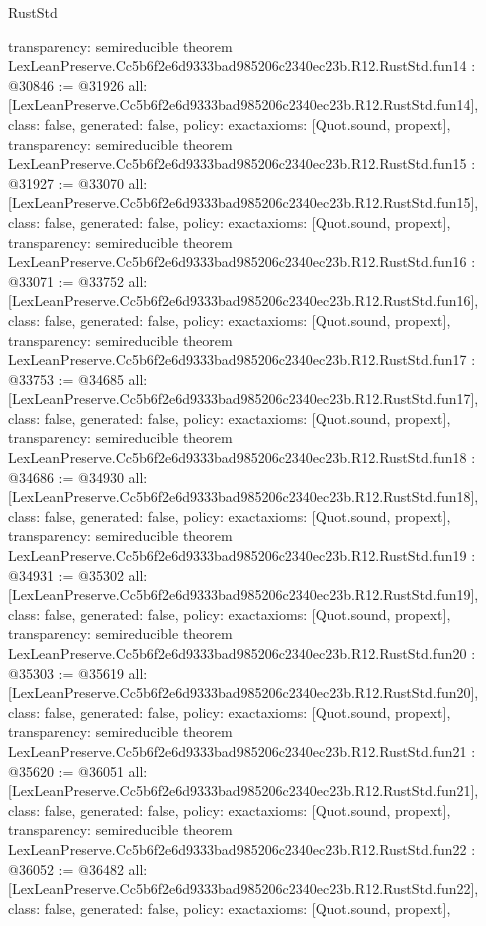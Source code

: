 \begin{lexlean}{RustStd}
\begin{coremodule}
{  transparency: semireducible
}
theorem LexLeanPreserve.Cc5b6f2e6d9333bad985206c2340ec23b.R12.RustStd.fun14 : @30846 := @31926 {
  all: [LexLeanPreserve.Cc5b6f2e6d9333bad985206c2340ec23b.R12.RustStd.fun14],
  class: false,
  generated: false,
  policy: exact{axioms: [Quot.sound, propext]},
  transparency: semireducible
}
theorem LexLeanPreserve.Cc5b6f2e6d9333bad985206c2340ec23b.R12.RustStd.fun15 : @31927 := @33070 {
  all: [LexLeanPreserve.Cc5b6f2e6d9333bad985206c2340ec23b.R12.RustStd.fun15],
  class: false,
  generated: false,
  policy: exact{axioms: [Quot.sound, propext]},
  transparency: semireducible
}
theorem LexLeanPreserve.Cc5b6f2e6d9333bad985206c2340ec23b.R12.RustStd.fun16 : @33071 := @33752 {
  all: [LexLeanPreserve.Cc5b6f2e6d9333bad985206c2340ec23b.R12.RustStd.fun16],
  class: false,
  generated: false,
  policy: exact{axioms: [Quot.sound, propext]},
  transparency: semireducible
}
theorem LexLeanPreserve.Cc5b6f2e6d9333bad985206c2340ec23b.R12.RustStd.fun17 : @33753 := @34685 {
  all: [LexLeanPreserve.Cc5b6f2e6d9333bad985206c2340ec23b.R12.RustStd.fun17],
  class: false,
  generated: false,
  policy: exact{axioms: [Quot.sound, propext]},
  transparency: semireducible
}
theorem LexLeanPreserve.Cc5b6f2e6d9333bad985206c2340ec23b.R12.RustStd.fun18 : @34686 := @34930 {
  all: [LexLeanPreserve.Cc5b6f2e6d9333bad985206c2340ec23b.R12.RustStd.fun18],
  class: false,
  generated: false,
  policy: exact{axioms: [Quot.sound, propext]},
  transparency: semireducible
}
theorem LexLeanPreserve.Cc5b6f2e6d9333bad985206c2340ec23b.R12.RustStd.fun19 : @34931 := @35302 {
  all: [LexLeanPreserve.Cc5b6f2e6d9333bad985206c2340ec23b.R12.RustStd.fun19],
  class: false,
  generated: false,
  policy: exact{axioms: [Quot.sound, propext]},
  transparency: semireducible
}
theorem LexLeanPreserve.Cc5b6f2e6d9333bad985206c2340ec23b.R12.RustStd.fun20 : @35303 := @35619 {
  all: [LexLeanPreserve.Cc5b6f2e6d9333bad985206c2340ec23b.R12.RustStd.fun20],
  class: false,
  generated: false,
  policy: exact{axioms: [Quot.sound, propext]},
  transparency: semireducible
}
theorem LexLeanPreserve.Cc5b6f2e6d9333bad985206c2340ec23b.R12.RustStd.fun21 : @35620 := @36051 {
  all: [LexLeanPreserve.Cc5b6f2e6d9333bad985206c2340ec23b.R12.RustStd.fun21],
  class: false,
  generated: false,
  policy: exact{axioms: [Quot.sound, propext]},
  transparency: semireducible
}
theorem LexLeanPreserve.Cc5b6f2e6d9333bad985206c2340ec23b.R12.RustStd.fun22 : @36052 := @36482 {
  all: [LexLeanPreserve.Cc5b6f2e6d9333bad985206c2340ec23b.R12.RustStd.fun22],
  class: false,
  generated: false,
  policy: exact{axioms: [Quot.sound, propext]},
}
\end{coremodule}
\end{lexlean}
